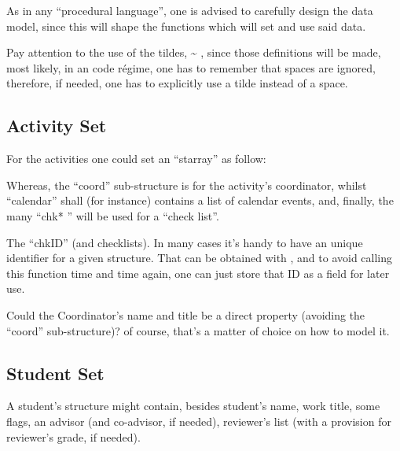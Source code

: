\documentclass[10pt]{article}
\begin{document}
\begin{tsremark}
As in any ``procedural language'', one is advised to  carefully design the data model, since this will shape the functions which will set and use said data.
\end{tsremark}

\begin{tsremark}
  Pay attention to the use of the tildes,  \~{} , since those definitions will be made, most likely, in an  code régime, one has to remember that spaces are ignored, therefore, if needed, one has to explicitly use a tilde instead of a space.
\end{tsremark}


\subsection{Activity Set}\label{Activity-set}
For the activities one could set an ``starray'' as follow:









Whereas, the ``coord'' sub-structure is for the activity's coordinator, whilst ``calendar'' shall (for instance) contains a list of calendar events, and, finally, the many ``chk* '' will be used for a ``check list''.

\begin{tsremark}
The ``chkID'' (and checklists). In many cases it's handy to have an unique identifier for a given structure. That can be obtained with , and to avoid calling this function time and time again, one can just store that ID as a field for later use.
\end{tsremark}
\begin{tsremark}
  Could the Coordinator's name and title be a direct property (avoiding the ``coord'' sub-structure)? of course, that's a matter of choice on how to model it.
\end{tsremark}





\subsection{Student Set}
A student's structure might contain, besides student's name, work title, some flags, an advisor (and co-advisor, if needed), reviewer's list (with a provision for reviewer's grade, if needed).
\end{document}
